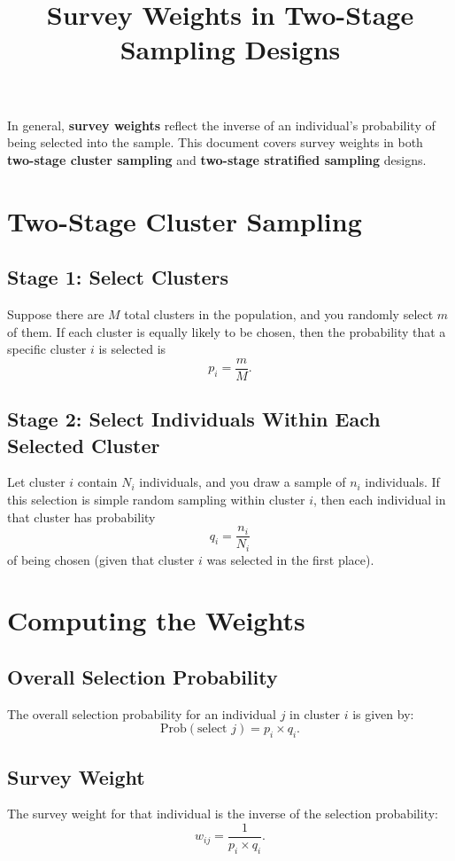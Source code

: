 \documentclass[12pt]{article}
\title{Survey Weights in Two-Stage Sampling Designs}
\author{}
\date{}
\begin{document}
\maketitle

In general, \textbf{survey weights} reflect the inverse of an individual’s probability of being selected into the sample. This document covers survey weights in both \textbf{two-stage cluster sampling} and \textbf{two-stage stratified sampling} designs.

\section{Two-Stage Cluster Sampling}

\subsection{Stage 1: Select Clusters}
Suppose there are \( M \) total clusters in the population, and you randomly select \( m \) of them. If each cluster is equally likely to be chosen, then the probability that a specific cluster \( i \) is selected is
\[
p_i = \frac{m}{M}.
\]

\subsection{Stage 2: Select Individuals Within Each Selected Cluster}
Let cluster \( i \) contain \( N_i \) individuals, and you draw a sample of \( n_i \) individuals. If this selection is simple random sampling within cluster \( i \), then each individual in that cluster has probability
\[
q_i = \frac{n_i}{N_i}
\]
of being chosen (given that cluster \( i \) was selected in the first place).

\section{Computing the Weights}

\subsection{Overall Selection Probability}
The overall selection probability for an individual \( j \) in cluster \( i \) is given by:
\[
\text{Prob}(\text{select } j) = p_i \times q_i.
\]

\subsection{Survey Weight}
The survey weight for that individual is the inverse of the selection probability:
\[
w_{ij} = \frac{1}{p_i \times q_i}.
\]
\end{document}
